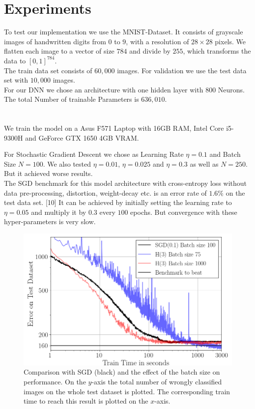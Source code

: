 \documentclass[conference]{IEEEtran}
\begin{document}
\section{Experiments}
\noindent
To test our implementation we use the MNIST-Dataset.
It consists of grayscale images of handwritten digits from $0$ to $9$, with a resolution of $28\times28$ pixels. We flatten each image to a vector of size $784$ and divide by $255$, which transforms the data to $[0,1]^{784}$.\\ The train data set consists of $60,000$ images. For validation we use the test data set with $10,000$ images.\\ 
For our DNN we chose an architecture with one hidden layer with $800$ Neurons. The total Number of trainable Parameters is $636,010$.\\
\\ \ \\ We train the model on a Asus F571 Laptop with 16GB RAM, Intel Core i5-9300H and GeForce GTX 1650 4GB VRAM.

\noindent
For Stochastic Gradient Descent we chose as Learning Rate $\eta=0.1$ and Batch Size $N=100$. We also tested $\eta=0.01$, $\eta=0.025$ and $\eta=0.3$ as well as $N=250$. But it achieved worse results. \\
The SGD benchmark for this model architecture with cross-entropy loss without data pre-processing, distortion, weight-decay etc. is an error rate of $1.6\%$ on the test data set. [10] 
It can be achieved by initially setting the learning rate to $\eta=0.05$ and multiply it by $0.3$ every $100$ epochs. But convergence with these hyper-parameters is very slow.	
\begin{figure}[htbp]
	\centerline{\includegraphics[scale=0.52]{Plot_Batch_size.png}}
	\caption{Comparison with SGD (black) and the effect of the batch size on performance. On the $y$-axis the total number of wrongly classified images on the whole test dataset is plotted. The corresponding train time to reach this result is plotted on the $x$-axis.}
	\label{fig}
\end{figure}	
\end{document}
